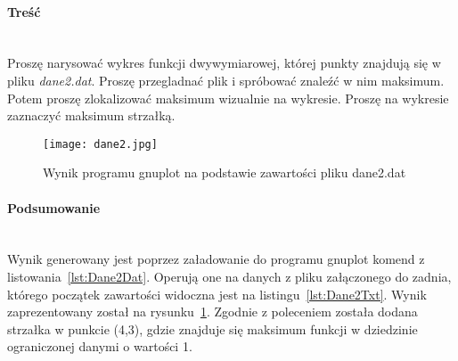 \paragraph{Treść}~\\
Proszę narysować wykres funkcji dwywymiarowej, której punkty znajdują się w pliku \textit{dane2.dat}.
Proszę przegladnać plik i spróbować znaleźć w nim maksimum.
Potem proszę zlokalizować maksimum wizualnie na wykresie.
Proszę na wykresie zaznaczyć maksimum strzałką.





\begin{figure}[p]
  \caption{Wynik programu gnuplot na podstawie zawartości pliku dane2.dat}
  \label{fig:Dane2Jpg}
  \centering
  \texttt{[image: dane2.jpg]}
\end{figure}

\paragraph{Podsumowanie}~\\
Wynik generowany jest poprzez załadowanie do programu gnuplot komend z listowania~\ref{lst:Dane2Dat}.
Operują one na danych z pliku załączonego do zadnia, którego początek zawartości widoczna jest na listingu~\ref{lst:Dane2Txt}.
Wynik zaprezentowany został na rysunku~\ref{fig:Dane2Jpg}.
Zgodnie z poleceniem została dodana strzałka w punkcie (4,3), gdzie znajduje się maksimum funkcji w dziedzinie ograniczonej danymi o wartości 1.
